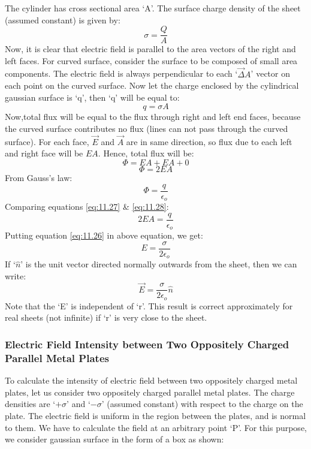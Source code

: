 The cylinder has cross sectional area ‘A’.
The surface charge density of the sheet (assumed constant) is given by:
\begin{equation}
  \sigma = \frac{Q}{A} \nonumber
\end{equation}
Now, it is clear that electric field is parallel to the area
vectors of the right and left faces. For curved surface,
consider the surface to be composed of small area components.
The electric field is always perpendicular to each ‘$\vec\Delta A$’
vector on each point on the curved surface. Now let the charge
enclosed by the cylindrical gaussian surface is ‘q’,
then ‘q’ will be equal to:
\begin{equation}\label{eq:11.26}
  q = \sigma A
\end{equation}
Now,total flux will be equal to the flux through right and left end faces,
because the curved surface contributes no flux (lines can  not pass
through the curved surface). For each face, $\vec{E}$ and $\vec{A}$
are in same direction, so flux due to each left and right face will be $EA$.
Hence, total flux will be:
\begin{equation}
  \Phi = EA + EA + 0 \nonumber
\end{equation}
\begin{equation}\label{eq:11.27}
  \Phi = 2EA 
\end{equation}
From Gauss's law:
\begin{equation}\label{eq:11.28}
  \Phi = \frac{q}{\epsilon_{o}}
\end{equation}
Comparing equations \ref{eq:11.27} \& \ref{eq:11.28}:
\begin{equation}
  2EA = \frac{q}{\epsilon_{o}} \nonumber
\end{equation}
Putting equation \ref{eq:11.26} in above equation, we get:
\begin{equation}\label{eq:11.29}
  E = \frac{\sigma}{2\epsilon_{o}}
\end{equation}
If `$\hat{n}$' is the unit vector directed normally outwards from the sheet,
then we can write:
\begin{equation}\label{eq:11.30}
  \vec{E} = \frac{\sigma}{2\epsilon_{o}} \hat{n}
\end{equation} 
Note that the ‘E’ is independent of ‘r’. This result is correct
approximately for real sheets (not infinite) if ‘r’ is very close
to the sheet.
\subsubsection{Electric Field Intensity between Two Oppositely Charged Parallel Metal Plates}
To calculate the intensity of electric field between two oppositely
charged metal plates, let us consider two oppositely charged parallel
metal plates. The charge densities are ‘$+\sigma$’ and ‘$-\sigma$’ (assumed constant)
with respect to the charge on the plate. The electric field is uniform
in the region between the plates, and is normal to them.
We have to calculate the field at an arbitrary point ‘P’.
For this purpose, we consider gaussian surface in the form of a box
as shown:

